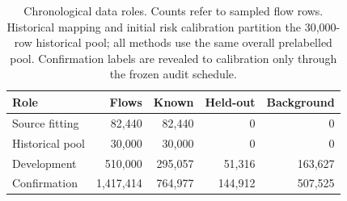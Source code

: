\begin{table}[tb]
\centering
\small
\caption{Chronological data roles. Counts refer to sampled flow rows. Historical mapping and initial risk calibration partition the 30,000-row historical pool; all methods use the same overall prelabelled pool. Confirmation labels are revealed to calibration only through the frozen audit schedule.}
\label{tab:cohorts}
\setlength{\tabcolsep}{4pt}
\begin{tabular}{lrrrr}
\toprule
Role & Flows & Known & Held-out & Background \\
\midrule
Source fitting & 82,440 & 82,440 & 0 & 0 \\
Historical pool & 30,000 & 30,000 & 0 & 0 \\
Development & 510,000 & 295,057 & 51,316 & 163,627 \\
Confirmation & 1,417,414 & 764,977 & 144,912 & 507,525 \\
\bottomrule
\end{tabular}
\end{table}
